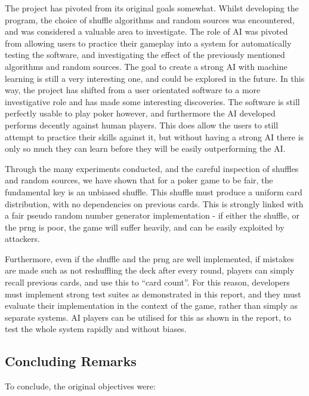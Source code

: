 The project has pivoted from its original goals somewhat. Whilst
developing the program, the choice of shuffle algorithms and random sources
was encountered, and was considered a valuable area to investigate. The
role of AI was pivoted from allowing users to practice their gameplay into
a system for automatically testing the software, and investigating the
effect of the previously mentioned algorithms and random sources. The goal
to create a strong AI with machine learning is still a very interesting one,
and could be explored in the future. In this way, the project has shifted
from a user orientated software to a more investigative role and has made
some interesting discoveries. The software is still perfectly usable to play
poker however, and furthermore the AI developed performs decently against
human players. This does allow the users to still attempt to practice their
skills against it, but without having a strong AI there is only so much they
can learn before they will be easily outperforming the AI\@.

Through the many experiments conducted, and the careful inspection of
shuffles and random sources, we have shown that for a poker game to be fair,
the fundamental key is an unbiased shuffle. This shuffle must produce a uniform
card distribution, with no dependencies on previous cards.
This is strongly linked with a fair pseudo
random number generator implementation - if either the shuffle, or the prng
is poor, the game will suffer heavily, and can be easily exploited by attackers.

Furthermore, even if the shuffle and the prng are well implemented, if mistakes
are made such as not reshuffling the deck after every round, players can simply
recall previous cards, and use this to ``card count''. For this reason, developers
must implement strong test suites as demonstrated in this report, and they
must evaluate their implementation in the context of the game, rather than
simply as separate systems. AI players can be utilised for this as shown in the
report, to test the whole system rapidly and without biases.

\subsection{Concluding Remarks}

To conclude, the original objectives were:

